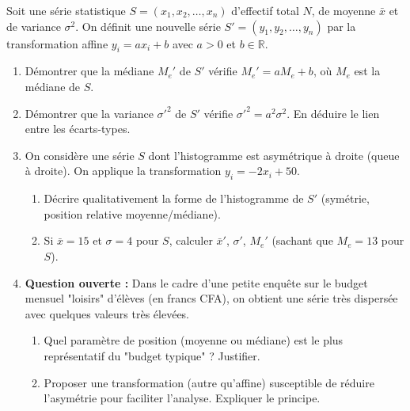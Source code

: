 \documentclass[11pt]{article}
\begin{document}
\begin{exercice}
Soit une série statistique $S = (x_1, x_2, \dots, x_n)$ d'effectif total $N$, de moyenne $\bar{x}$ et de variance $\sigma^2$. On définit une nouvelle série $S' = (y_1, y_2, \dots, y_n)$ par la transformation affine $y_i = a x_i + b$ avec $a > 0$ et $b \in \mathbb{R}$.
\begin{enumerate}
    \item Démontrer que la médiane $M_e'$ de $S'$ vérifie $M_e' = a M_e + b$, où $M_e$ est la médiane de $S$.
    \item Démontrer que la variance $\sigma'^2$ de $S'$ vérifie $\sigma'^2 = a^2 \sigma^2$. En déduire le lien entre les écarts-types.
    \item On considère une série $S$ dont l'histogramme est asymétrique à droite (queue à droite). On applique la transformation $y_i = -2x_i + 50$.
    \begin{enumerate}
        \item Décrire qualitativement la forme de l'histogramme de $S'$ (symétrie, position relative moyenne/médiane).
        \item Si $\bar{x} = 15$ et $\sigma = 4$ pour $S$, calculer $\bar{x}'$, $\sigma'$, $M_e'$ (sachant que $M_e = 13$ pour $S$).
    \end{enumerate}
    \item \textbf{Question ouverte :} Dans le cadre d'une petite enquête sur le budget mensuel "loisirs" d'élèves (en francs CFA), on obtient une série très dispersée avec quelques valeurs très élevées. 
    \begin{enumerate}
        \item Quel paramètre de position (moyenne ou médiane) est le plus représentatif du "budget typique" ? Justifier.
        \item Proposer une transformation (autre qu'affine) susceptible de réduire l'asymétrie pour faciliter l'analyse. Expliquer le principe.
    \end{enumerate}
\end{enumerate}
\end{exercice}
\end{document}
